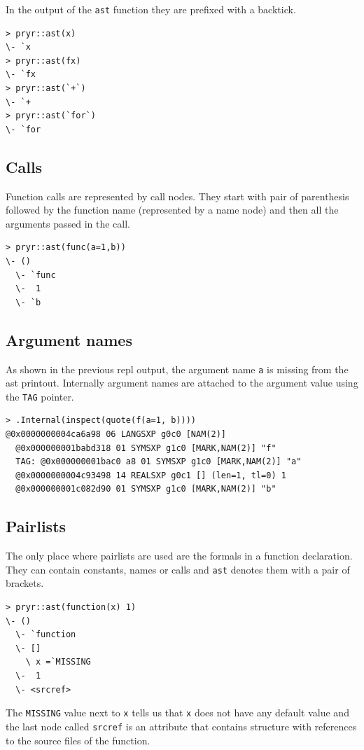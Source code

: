 \documentclass[thesis=B,english]{FITthesis}[2012/10/20]
\begin{document}
In the output of the \verb|ast| function they are prefixed with a backtick.

\begin{verbatim}
> pryr::ast(x)
\- `x
> pryr::ast(fx)
\- `fx
> pryr::ast(`+`)
\- `+
> pryr::ast(`for`)
\- `for
\end{verbatim}

\subsection{Calls}
Function calls are represented by call nodes. They start with pair of parenthesis followed by the function name (represented by a name node) and then all the arguments passed in the call.

\begin{verbatim}
> pryr::ast(func(a=1,b))
\- ()
  \- `func
  \-  1
  \- `b
\end{verbatim}

\subsection{Argument names}
As shown in the previous repl output, the argument name \verb|a| is missing from the ast printout. Internally argument names are attached to the argument value using the \verb|TAG| pointer.\cite{specs} 

\begin{verbatim}
> .Internal(inspect(quote(f(a=1, b))))
@0x0000000004ca6a98 06 LANGSXP g0c0 [NAM(2)]
  @0x000000001babd318 01 SYMSXP g1c0 [MARK,NAM(2)] "f"
  TAG: @0x000000001bac0 a8 01 SYMSXP g1c0 [MARK,NAM(2)] "a"
  @0x0000000004c93498 14 REALSXP g0c1 [] (len=1, tl=0) 1
  @0x000000001c082d90 01 SYMSXP g1c0 [MARK,NAM(2)] "b"
\end{verbatim}

\subsection{Pairlists}
The only place where pairlists are used are the formals in a function declaration. They can contain constants, names or calls and \verb|ast| denotes them with a pair of brackets.

\begin{verbatim}
> pryr::ast(function(x) 1)
\- ()
  \- `function
  \- []
    \ x =`MISSING
  \-  1
  \- <srcref>
\end{verbatim}

The \verb|MISSING| value next to \verb|x| tells us that \verb|x| does not have any default value and the last node called \verb|srcref| is an attribute that contains structure with references to the source files of the function.
\end{document}

